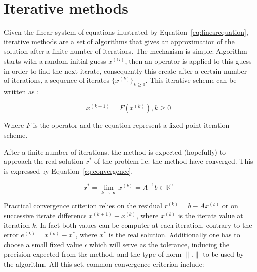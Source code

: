 


\section{Iterative methods}

Given the linear system of equations illustrated by Equation~\ref{eq:linearequation}, iterative methods are a set of algorithms that gives an approximation of the solution after a finite number of iterations. The mechanism is simple: Algorithm starts with a random initial guess $x^{(O)}$, then an operator is applied to this guess in order to find the next iterate, consequently this create after a certain number of iterations, a sequence of iterates $\{x^{(k)}\}_{k \geq 0}$. This iterative scheme can be written as :

\begin{equation}
    x^{(k + 1)} = F{(x^{(k)})}, k \geq 0
    \label{eq:iterations}
\end{equation}

Where $F$ is the operator and the equation represent a fixed-point iteration scheme. 

After a finite number of iterations, the method is expected (hopefully) to approach the real solution $x^*$ of the problem i.e. the method have converged. This is expressed by Equation~\ref{eq:convergence}.

\begin{equation}
     x^{*}  =\lim_{k \to \infty} x^{(k)} = A^{-1}b \in \mathbb{R}^n
    \label{eq:convergence}
\end{equation}

Practical convergence criterion relies on the residual $r^{(k)} = b - Ax^{(k)}$ or on successive iterate difference $x^{(k+1)} - x^{(k)}$, where $x^{(k)}$ is the iterate value at iteration $k$. In fact both values can be computer at each iteration, contrary to the error $e^{(k)} = x^{(k)} - x^*$, where $x^*$ is the real solution. Additionally one has to choose a small fixed value $\epsilon$ which will serve as the tolerance, inducing the precision expected from the method, and the type of norm $\|.\|$ to be used by the algorithm. All this set, common convergence criterion include:

